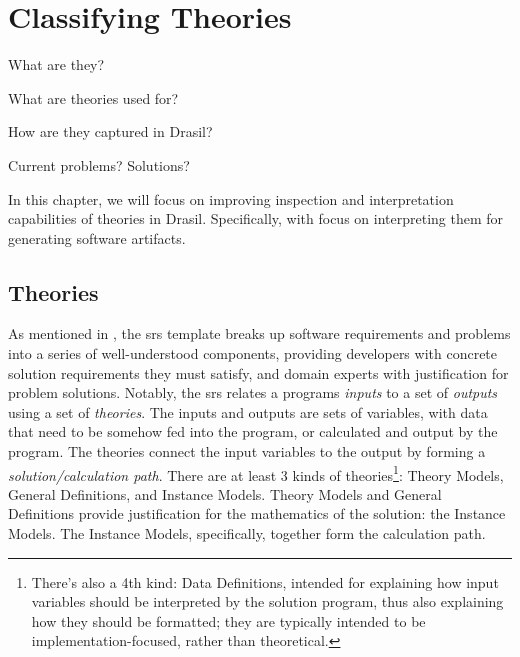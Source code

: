 \chapter{Classifying Theories}
\label{chap:framing-theories}

\begin{writingdirectives}
    \item What are they?
    \item What are theories used for?
    \item How are they captured in Drasil?
    \item Current problems? Solutions?
\end{writingdirectives}

In this chapter, we will focus on improving inspection and interpretation
capabilities of theories in Drasil. Specifically, with focus on interpreting
them for generating software artifacts.

\section{Theories}
\label{chap:framing-theories:sec:theories}

As mentioned in , the \acs{srs} template
\cite{SmithAndLai2005} breaks up software requirements and problems into a
series of well-understood components, providing developers with concrete
solution requirements they must satisfy, and domain experts with justification
for problem solutions. Notably, the \acs{srs} relates a programs \textit{inputs}
to a set of \textit{outputs} using a set of \textit{theories}. The inputs and
outputs are sets of variables, with data that need to be somehow fed into the
program, or calculated and output by the program. The theories connect the input
variables to the output by forming a \textit{solution/calculation path}. There
are at least 3 kinds of theories\footnote{There's also a 4th kind: Data
Definitions, intended for explaining how input variables should be interpreted
by the solution program, thus also explaining how they should be formatted; they
are typically intended to be implementation-focused, rather than theoretical.}:
Theory Models, General Definitions, and Instance Models. Theory Models and
General Definitions provide justification for the mathematics of the solution:
the Instance Models. The Instance Models, specifically, together form the
calculation path.

